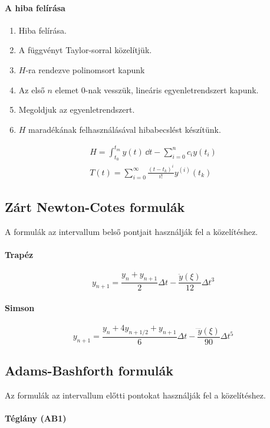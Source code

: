 \documentclass[../../main.tex]{subfiles}
\begin{document}
\paragraph{A hiba felírása}
\begin{enumerate}
  \item Hiba felírása.
  \item A függvényt Taylor-sorral közelítjük.
  \item $H$-ra rendezve polinomsort kapunk
  \item Az első $n$ elemet 0-nak vesszük, lineáris egyenletrendszert kapunk.
  \item Megoldjuk az egyenletrendszert.
  \item $H$ maradékának felhasználásával hibabecslést készítünk.
\end{enumerate}
\begin{gather*}
  H
  = \int_{t_0}^{t_m} y(t) \, \dd t
  - \sum_{i=0}^n c_i y(t_i)
  \\
  T(t)
  = \sum_{i=0}^\infty \frac{(t - t_k)^i}{i!}y^{(i)}(t_k)
\end{gather*}

\subsection{Zárt Newton-Cotes formulák}

A  formulák az intervallum belső pontjait használják
fel a közelítéshez.

\paragraph{Trapéz}
\[
  y_{n + 1}
  = \frac{y_n + y_{n + 1}}{2} \Delta t
  - \frac{\ddot y(\xi)}{12} \Delta t^3
\]

\paragraph{Simson}
\[
  y_{n + 1}
  = \frac{y_n +  4 y_{n + 1/2} + y_{n + 1}}{6} \Delta t
  - \frac{\ddddot y(\xi)}{90} \Delta t^5
\]

\subsection{Adams-Bashforth formulák}

Az  formulák az intervallum előtti pontokat használják
fel a közelítéshez.

\paragraph{Téglány (AB1)}
\end{document}
